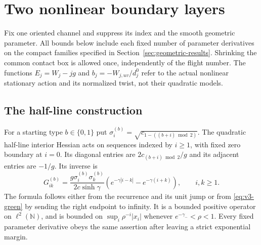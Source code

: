 \section{Two nonlinear boundary layers}
\label{sec:v4-boundary}
Fix one oriented channel and suppress its index and the smooth geometric
parameter. All bounds below include each fixed number of parameter
derivatives on the compact families specified in
Section~\ref{sec:geometric-results}. Shrinking the common contact box is
allowed once, independently of the flight number. The functions
$E_j=W_j-jg$ and $b_j=-W_{j,uv}/d_j^0$ refer to the actual nonlinear
stationary action and its normalized twist, not their quadratic models.

\subsection{The half-line construction}
For a starting type $b\in\{0,1\}$ put
$\sigma_i^{(b)}=\sqrt{c_{1-((b+i)\bmod2)}}$. The quadratic half-line
interior Hessian acts on sequences indexed by $i\ge1$, with fixed zero
boundary at $i=0$. Its diagonal entries are $2c_{(b+i)\bmod2}/g$
and its adjacent entries are $-1/g$. Its inverse is
\begin{equation}\label{eq:v4-half-green}
 G^{(b)}_{ik}=\frac{g\sigma_i^{(b)}\sigma_k^{(b)}}{2c\sinh\gamma}
 \left(e^{-\gamma|i-k|}-e^{-\gamma(i+k)}\right),\qquad i,k\ge1.
\end{equation}
The formula follows either from the recurrence and its unit jump or
from \eqref{eq:v3-green} by sending the right endpoint to infinity.
It is a bounded positive operator on $\ell^2(\mathbb N)$, and is
bounded on $\sup_i\rho^{-i}|x_i|$ whenever
$e^{-\gamma_-}<\rho<1$. Every fixed parameter derivative obeys the
same assertion after leaving a strict exponential margin.

